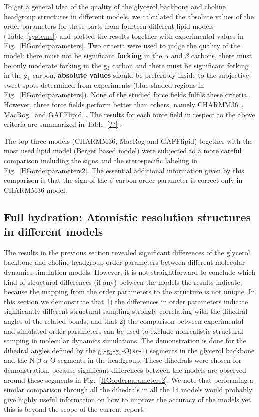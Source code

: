 \documentclass[pre,aps,floatfix,authordate1-4,twocolumn]{revtex4-1}
\begin{document}
To get a general idea of the quality of the glycerol backbone and choline headgroup structures in different models, we calculated the absolute
values of the order parameters for these parts from fourteen different lipid models (Table~\ref{systems}) and 
plotted the results together with experimental values in Fig.~\ref{HGorderparameters}.
Two criteria were used to judge the quality of the model: there must not be significant  {\bf forking} in the $\alpha$ and $\beta$ carbons,
there must be only moderate forking in the g$_3$ carbon and there must be significant forking in the g$_1$ carbon, {\bf absolute values}
should be preferably inside to the subjective sweet spots determined from experiments (blue shaded regions in Fig.~\ref{HGorderparameters}).
None of the studied force fields fulfils these criteria. However, three force fields perform better than others, namely CHARMM36~\cite{klauda10}, MacRog~\cite{maciejewski14} and GAFFlipid~\cite{dickson12}.
The results for each force field in respect to the above criteria are summarized in Table~\ref{??} .

The top three models (CHARMM36, MacRog and GAFFlipid) together with the most used lipid model (Berger based model) 
were subjected to a more careful comparison including the signs and the sterospecific labeling in Fig.~\ref{HGorderparameters2}.
The essential additional information given by this comparison is that the sign of the $\beta$ carbon order parameter is correct only in CHARMM36 model.


\subsection{Full hydration: Atomistic resolution structures in different models}

The results in the previous section revealed significant differences of the glycerol backbone and choline headgroup
order parameters between different molecular dynamics simulation models.
However, it is not straightforward to conclude which kind of structural differences (if any)
between the models the results indicate, because the mapping from the order parameters to the 
structure is not unique. In this section we demonstrate that 1) the differences in order parameters
indicate significantly different structural sampling strongly correlating with the dihedral angles of the related bonds,
and that 2) the comparison between experimental and simulated order parameters can be used to exclude
nonrealistic structural samping in molecular dynamics simulations. The demonstration is done for 
the dihedral angles defined by the g$_3$-g$_2$-g$_1$-O(\textit{sn}-1) segments in the glycerol backbone and 
the N-$\beta$-$\alpha$-O segments in the headgroup. These dihedrals were chosen for demonstration, because 
significant differences between the models are observed around these segments in Fig.~\ref{HGorderparameters2}.
We note that performing a similar comparison through all the dihedrals in all the 14 models would probably give highly useful
information on how to improve the accuracy of the models yet this is beyond the scope of the current report. 
\end{document}
